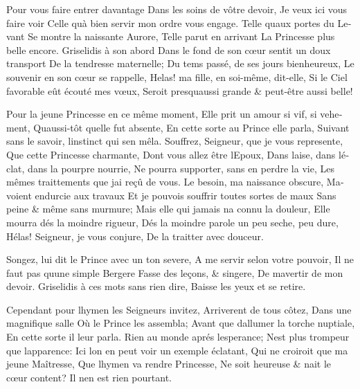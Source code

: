 \documentclass[14pt,a4paper]{memoir}
\begin{document}
\begin{otherlanguage}{french}
{Pour vous faire entrer davantage} {Dans les soins de vôtre devoir,} {Je
veux ici vous faire voir} {Celle qu\textquotesingle à bien servir mon
ordre vous engage.} {Telle qu\textquotesingle aux portes du Levant} {Se
montre la naissante Aurore,} {Telle parut en arrivant} {La Princesse
plus belle encore.} {Griselidis à son abord} {Dans le fond de son cœur
sentit un doux transport} {De la tendresse maternelle;} {Du tems passé,
de ses jours bienheureux,} {Le souvenir en son cœur se rappelle,}
{Helas! ma fille, en soi-même, dit-elle,} {Si le Ciel favorable eût
écouté mes vœux, } {Seroit presqu\textquotesingle aussi grande \&
peut-être aussi belle!}

{Pour la jeune Princesse en ce même moment,} {Elle prit un amour si vif,
si vehement,} {Qu\textquotesingle aussi-tôt qu\textquotesingle elle fut
absente,} {En cette sorte au Prince elle parla,} {Suivant sans le
savoir, l\textquotesingle instinct qui s\textquotesingle en mêla. }
{Souffrez, Seigneur, que je vous represente,} {Que cette Princesse
charmante,} {Dont vous allez être l\textquotesingle Epoux,} {Dans
l\textquotesingle aise, dans l\textquotesingle éclat, dans la pourpre
nourrie,} {Ne pourra supporter, sans en perdre la vie,} {Les mêmes
traittements que j\textquotesingle ai reçû de vous.} {Le besoin, ma
naissance obscure,} {M\textquotesingle avoient endurcie aux travaux} {Et
je pouvois souffrir toutes sortes de maux} {Sans peine \& même sans
murmure;} {Mais elle qui jamais n\textquotesingle a connu la douleur,}
{Elle mourra dés la moindre rigueur,} {Dés la moindre parole un peu
seche, peu dure,} {Hélas! Seigneur, je vous conjure,} {De la traitter
avec douceur.}

{Songez, lui dit le Prince avec un ton severe,} {A me servir selon votre
pouvoir,} {Il ne faut pas qu\textquotesingle une simple Bergere} {Fasse
des leçons, \& s\textquotesingle ingere,} {De m\textquotesingle avertir
de mon devoir.} {Griselidis à ces mots sans rien dire,} {Baisse les yeux
et se retire.}

{Cependant pour l\textquotesingle hymen les Seigneurs invitez,}
{Arriverent de tous côtez,} {Dans une magnifique salle} {Où le Prince
les assembla;} {Avant que d\textquotesingle allumer la torche nuptiale,}
{En cette sorte il leur parla.} {Rien au monde aprés
l\textquotesingle esperance;} {N\textquotesingle est plus trompeur que
l\textquotesingle apparence:} {Ici l\textquotesingle on en peut voir un
exemple éclatant,} {Qui ne croiroit que ma jeune Maîtresse,} {Que
l\textquotesingle hymen va rendre Princesse,} {Ne soit heureuse \&
n\textquotesingle ait le cœur content?} {Il n\textquotesingle en est
rien pourtant.}


\end{otherlanguage}
\end{document}

